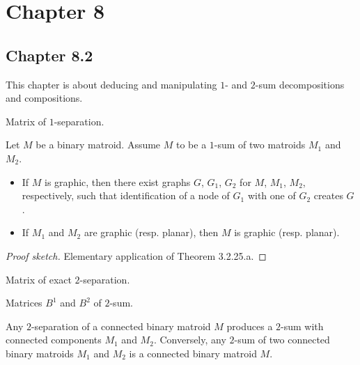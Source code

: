 \section{Chapter 8}

\subsection{Chapter 8.2}

This chapter is about deducing and manipulating $1$- and $2$-sum decompositions and compositions.

\begin{proposition}[8.2.1] %
  \label{prop:8.2.1}
  Matrix of $1$-separation.
\end{proposition}

\begin{lemma}[8.2.2]
  \label{lem:8.2.2}
  Let $M$ be a binary matroid. Assume $M$ to be a $1$-sum of two matroids $M_{1}$ and $M_{2}$.
  \begin{itemize}
    \item If $M$ is graphic, then there exist graphs $G$, $G_{1}$, $G_{2}$ for $M$, $M_{1}$, $M_{2}$, respectively, such that identification of a node of $G_{1}$ with one of $G_{2}$ creates $G$.
    \item If $M_{1}$ and $M_{2}$ are graphic (resp. planar), then $M$ is graphic (resp. planar).
  \end{itemize}
\end{lemma}

\begin{proof}[Proof sketch]
  Elementary application of Theorem 3.2.25.a.
\end{proof}

\begin{proposition}[8.2.3]
  \label{prop:8.2.3}
  Matrix of exact $2$-separation.
\end{proposition}

\begin{proposition}[8.2.4] %
  \label{prop:8.2.4}
  Matrices $B^{1}$ and $B^{2}$ of $2$-sum.
\end{proposition}

\begin{lemma}[8.2.6]
  \label{lem:8.2.6}
  Any $2$-separation of a connected binary matroid $M$ produces a $2$-sum with connected components $M_{1}$ and $M_{2}$.
  Conversely, any $2$-sum of two connected binary matroids $M_{1}$ and $M_{2}$ is a connected binary matroid $M$.
\end{lemma}

